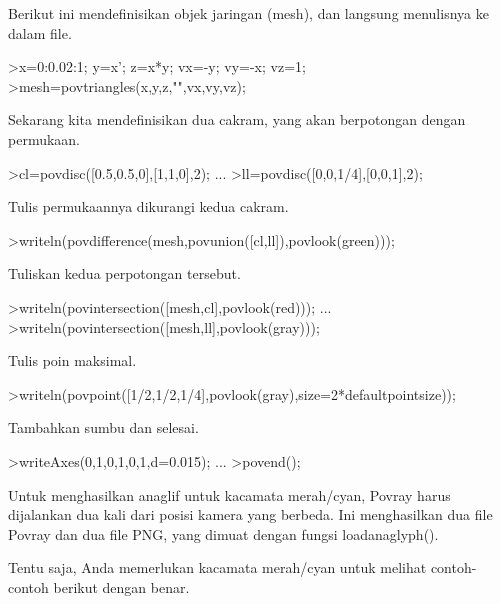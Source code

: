 \documentclass{article}
\begin{document}
\begin{eulernotebook}
\begin{eulercomment}
\begin{eulercomment}
\begin{eulercomment}
\begin{eulercomment}
\begin{eulercomment}
Berikut ini mendefinisikan objek jaringan (mesh), dan langsung
menulisnya ke dalam file.
\end{eulercomment}
\begin{eulerprompt}
>x=0:0.02:1; y=x'; z=x*y; vx=-y; vy=-x; vz=1;
>mesh=povtriangles(x,y,z,"",vx,vy,vz);
\end{eulerprompt}
\begin{eulercomment}
Sekarang kita mendefinisikan dua cakram, yang akan berpotongan dengan
permukaan.
\end{eulercomment}
\begin{eulerprompt}
>cl=povdisc([0.5,0.5,0],[1,1,0],2); ...
>ll=povdisc([0,0,1/4],[0,0,1],2);
\end{eulerprompt}
\begin{eulercomment}
Tulis permukaannya dikurangi kedua cakram.
\end{eulercomment}
\begin{eulerprompt}
>writeln(povdifference(mesh,povunion([cl,ll]),povlook(green)));
\end{eulerprompt}
\begin{eulercomment}
Tuliskan kedua perpotongan tersebut.
\end{eulercomment}
\begin{eulerprompt}
>writeln(povintersection([mesh,cl],povlook(red))); ...
>writeln(povintersection([mesh,ll],povlook(gray)));
\end{eulerprompt}
\begin{eulercomment}
Tulis poin maksimal.
\end{eulercomment}
\begin{eulerprompt}
>writeln(povpoint([1/2,1/2,1/4],povlook(gray),size=2*defaultpointsize));
\end{eulerprompt}
\begin{eulercomment}
Tambahkan sumbu dan selesai.
\end{eulercomment}
\begin{eulerprompt}
>writeAxes(0,1,0,1,0,1,d=0.015); ...
>povend();
\end{eulerprompt}
\begin{eulercomment}
Untuk menghasilkan anaglif untuk kacamata merah/cyan, Povray harus
dijalankan dua kali dari posisi kamera yang berbeda. Ini menghasilkan
dua file Povray dan dua file PNG, yang dimuat dengan fungsi
loadanaglyph().

Tentu saja, Anda memerlukan kacamata merah/cyan untuk melihat
contoh-contoh berikut dengan benar.


\end{eulercomment}
\end{eulercomment}
\end{eulercomment}
\end{eulercomment}
\end{eulercomment}
\end{eulernotebook}
\end{document}
